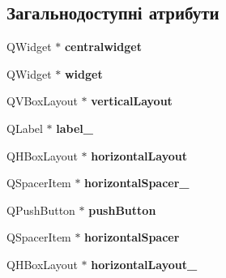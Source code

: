 \subsection*{Загальнодоступні атрибути}
\begin{DoxyCompactItemize}
\item 
\hypertarget{classUi__UserScreen_aa456c00b3f6c46d0206e4fcf527a6a89}{Q\-Widget $\ast$ {\bfseries centralwidget}}\label{classUi__UserScreen_aa456c00b3f6c46d0206e4fcf527a6a89}

\item 
\hypertarget{classUi__UserScreen_a95dc3007529cc02c13c783611d34765b}{Q\-Widget $\ast$ {\bfseries widget}}\label{classUi__UserScreen_a95dc3007529cc02c13c783611d34765b}

\item 
\hypertarget{classUi__UserScreen_aca4c45c2c86a24028fa9bd16eddf2405}{Q\-V\-Box\-Layout $\ast$ {\bfseries vertical\-Layout}}\label{classUi__UserScreen_aca4c45c2c86a24028fa9bd16eddf2405}

\item 
\hypertarget{classUi__UserScreen_a4fb44d0115ab2447fe44f647515d30f0}{Q\-Label $\ast$ {\bfseries label\-\_}}\label{classUi__UserScreen_a4fb44d0115ab2447fe44f647515d30f0}

\item 
\hypertarget{classUi__UserScreen_a33cd2426fac791217e960ca3beb1f4b3}{Q\-H\-Box\-Layout $\ast$ {\bfseries horizontal\-Layout}}\label{classUi__UserScreen_a33cd2426fac791217e960ca3beb1f4b3}

\item 
\hypertarget{classUi__UserScreen_adbce7d35fc870995b4d8afa24f1ba136}{Q\-Spacer\-Item $\ast$ {\bfseries horizontal\-Spacer\-\_}}\label{classUi__UserScreen_adbce7d35fc870995b4d8afa24f1ba136}

\item 
\hypertarget{classUi__UserScreen_ab5d805a65bf555e3f919349d8a0ca358}{Q\-Push\-Button $\ast$ {\bfseries push\-Button}}\label{classUi__UserScreen_ab5d805a65bf555e3f919349d8a0ca358}

\item 
\hypertarget{classUi__UserScreen_a43befe9963fa3c8bc2691dc1790ba300}{Q\-Spacer\-Item $\ast$ {\bfseries horizontal\-Spacer}}\label{classUi__UserScreen_a43befe9963fa3c8bc2691dc1790ba300}

\item 
\hypertarget{classUi__UserScreen_af830be55fae3ad35bc7f5d6a85306280}{Q\-H\-Box\-Layout $\ast$ {\bfseries horizontal\-Layout\-\_}}\label{classUi__UserScreen_af830be55fae3ad35bc7f5d6a85306280}


\end{DoxyCompactItemize}
